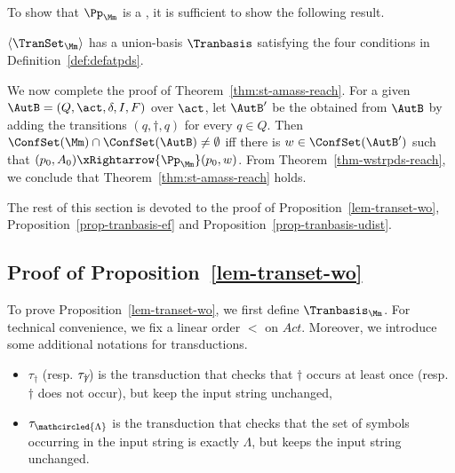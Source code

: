 To show that $\Pp_\Mm$ is a {\WOTrPDS}, it is sufficient to show the following result. 

\begin{proposition}\label{lem-transet-wo}
$\langle \TranSet_\Mm \rangle$ has a union-basis $\Tranbasis$ satisfying the four conditions in Definition~\ref{def:defatpds}.
\end{proposition}

We now complete the proof of Theorem~\ref{thm:st-amass-reach}. For a given {\NFA} $\AutB = (Q, \act, \delta, I, F)$ over $\act$, let $\AutB'$ be the {\NFA} obtained from $\AutB$ by adding the transitions $(q, \dag, q)$ for every $q \in Q$. Then $\ConfSet(\Mm) \cap \ConfSet(\AutB) \neq \emptyset$ iff there is $w \in \ConfSet(\AutB')$ such that $(p_0, A_0) \xRightarrow{\Pp_\Mm} (p_0, w)$.
From Theorem~\ref{thm-wstrpds-reach}, we conclude that Theorem~\ref{thm:st-amass-reach} holds.

The rest of this section is devoted to the proof of Proposition~\ref{lem-transet-wo}, Proposition~\ref{prop-tranbasis-ef} and Proposition~\ref{prop-tranbasis-udist}.


\subsection*{Proof of Proposition~\ref{lem-transet-wo}}
To prove Proposition~\ref{lem-transet-wo}, we first define $\Tranbasis_\Mm$.
For technical convenience, we fix a linear order $<$ on $Act$. Moreover, we introduce some additional notations for transductions.
\begin{itemize}
\item $\tau_\dag$ (resp. $\tau_{\not \dag}$) is the transduction that checks that $\dag$ occurs at least once (resp. $\dag$ does not occur), but keep the input string unchanged, 
%
\item $\tau_{\mathcircled{\Lambda}}$ is the transduction that checks that the set of symbols occurring in the input string is exactly $\Lambda$, %
but keeps the input string unchanged. 
\end{itemize}

